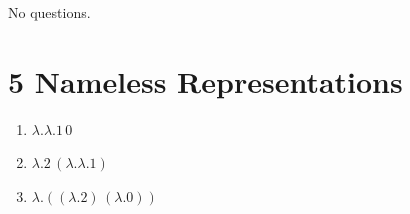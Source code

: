 \documentclass[13pt, a4paper]{article}
\begin{document}
No questions.

\section*{5 Nameless Representations}

\begin{enumerate}
\item $\lambda.\lambda.1\,0$
\item $\lambda.2\,(\lambda.\lambda.1)$
\item $\lambda.((\lambda.2)\,(\lambda.0))$
\end{enumerate}
\end{document}
